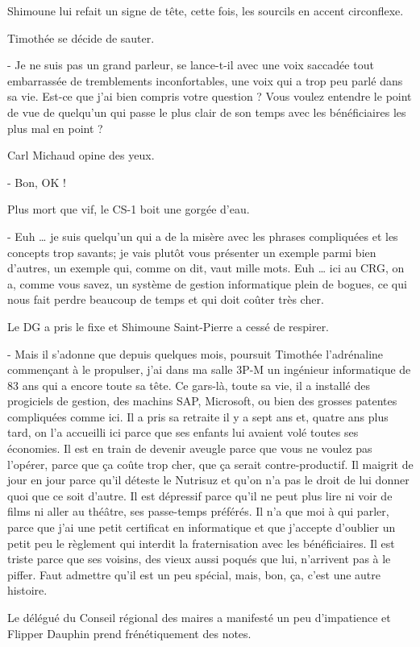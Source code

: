 Shimoune lui refait un signe de tête, cette fois, les sourcils en accent circonflexe.

Timothée se décide de sauter.

- Je ne suis pas un grand parleur, se lance-t-il avec une voix saccadée tout embarrassée de tremblements inconfortables, une voix qui a trop peu parlé dans sa vie. Est-ce que j’ai bien compris votre question ? Vous voulez entendre le point de vue de quelqu’un qui passe le plus clair de son temps avec les bénéficiaires les plus mal en point ?

Carl Michaud opine des yeux.

- Bon, OK !

Plus mort que vif, le CS-1 boit une gorgée d’eau.

- Euh … je suis quelqu’un qui a de la misère avec les phrases compliquées et les concepts trop savants; je vais plutôt vous présenter un exemple parmi bien d’autres, un exemple qui, comme on dit, vaut mille mots. Euh … ici au CRG, on a, comme vous savez, un système de gestion informatique plein de bogues, ce qui nous fait perdre beaucoup de temps et qui doit coûter très cher.

Le DG a pris le fixe et Shimoune Saint-Pierre a cessé de respirer.

- Mais il s’adonne que depuis quelques mois, poursuit Timothée l’adrénaline commençant à le propulser, j’ai dans ma salle 3P-M un ingénieur informatique de 83 ans qui a encore toute sa tête. Ce gars-là, toute sa vie, il a installé des progiciels de gestion, des machins SAP, Microsoft, ou bien des grosses patentes compliquées comme ici. Il a pris sa retraite il y a sept ans et, quatre ans plus tard, on l’a accueilli ici parce que ses enfants lui avaient volé toutes ses économies. Il est en train de devenir aveugle parce que vous ne voulez pas l’opérer, parce que ça coûte trop cher, que ça serait contre-productif. Il maigrit de jour en jour parce qu’il déteste le Nutrisuz et qu’on n’a pas le droit de lui donner quoi que ce soit d’autre. Il est dépressif parce qu’il ne peut plus lire ni voir de films ni aller au théâtre, ses passe-temps préférés. Il n’a que moi à qui parler, parce que j’ai une petit certificat en informatique et que j’accepte d’oublier un petit peu le règlement qui interdit la fraternisation avec les bénéficiaires. Il est triste parce que ses voisins, des vieux aussi poqués que lui, n’arrivent pas à le piffer. Faut admettre qu’il est un peu spécial, mais, bon, ça, c’est une autre histoire.

Le délégué du Conseil régional des maires a manifesté un peu d’impatience et Flipper Dauphin prend frénétiquement des notes.

